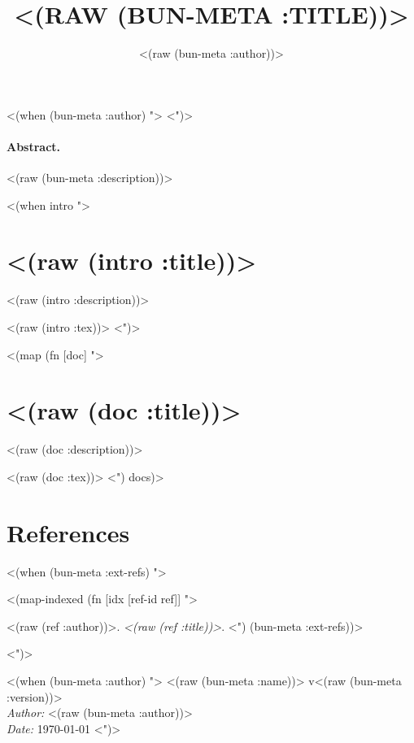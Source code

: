 \documentclass[a4paper,10pt]{article}
\author{<(raw (bun-meta :author))>}
\title{\uppercase{<(raw (bun-meta :title))>}}
\makeatletter
\def\maketitle{%
  \thispagestyle{empty}%
  \vskip 1cm
  \begin{center}
    \Large \strut \@title \par
  \end{center}
  \par
  <(when (bun-meta :author) ">
  <")>
  }
\makeatother
\begin{document}
\maketitle

\paragraph{Abstract.}
<(raw (bun-meta :description))>

<(when intro ">
\section*{<(raw (intro :title))>}

<(raw (intro :description))>

<(raw (intro :tex))>
<")>

<(map (fn [doc] ">
\section{<(raw (doc :title))>}

<(raw (doc :description))>

<(raw (doc :tex))>
<") docs)>

{\small
\section*{References}
<(when (bun-meta :ext-refs) ">
\begin{description}[leftmargin=3cm,style=nextline]
<(map-indexed
 (fn [idx [ref-id ref]] ">
\item[<(raw ref-id)>] <(raw (ref :author))>. \emph{<(raw (ref :title))>}.
<") (bun-meta :ext-refs))>
\end{description}
<")>
}

<(when (bun-meta :author) ">
\vspace{1.2em}
{\small
\noindent
<(raw (bun-meta :name))> v<(raw (bun-meta :version))>\\
\emph{Author:} <(raw (bun-meta :author))>\\
\emph{Date:} \today
}
<")>
\end{document}
